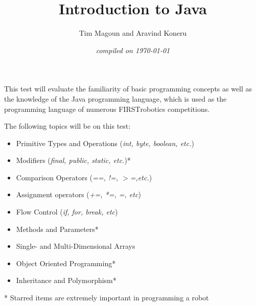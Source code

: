 \documentclass[11pt,fleqn]{article}
\begin{document}
\title{Introduction to \bf{Java}}
\author{Tim Magoun and Aravind Koneru}
\date{\it{compiled on} \today}
\maketitle


This test will evaluate the familiarity of basic programming concepts as well as the knowledge of the Java programming language, which is used as the programming language of numerous FIRST\textsuperscript\textregistered robotics competitions.


\vspace{5mm}
The following topics will be on this test:
\begin{itemize}
\item Primitive Types and Operations (\textit{int, byte, boolean, etc.})
\item Modifiers (\textit{final, public, static, etc.})*
\item Comparison Operators (\textit{==, !=, $\mathit{>}$=,etc.})
\item Assignment operators (\textit{+=, *=, =, etc})
\item Flow Control (\textit{if, for, break, etc})
\item Methods and Parameters*
\item Single- and Multi-Dimensional Arrays
\item Object Oriented Programming*
\item Inheritance and Polymorphism*
\end{itemize}

* Starred items are extremely important in programming a robot
\end{document}
